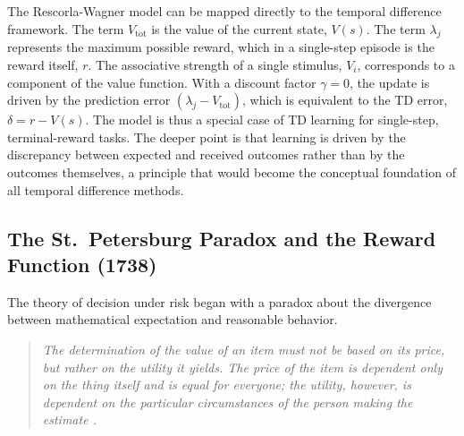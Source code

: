 The Rescorla-Wagner model can be mapped directly to the temporal difference framework. The term $V_{\text{tot}}$ is the value of the current state, $V(s)$. The term $\lambda_j$ represents the maximum possible reward, which in a single-step episode is the reward itself, $r$. The associative strength of a single stimulus, $V_i$, corresponds to a component of the value function. With a discount factor $\gamma=0$, the update is driven by the prediction error $(\lambda_j - V_{\text{tot}})$, which is equivalent to the TD error, $\delta = r - V(s)$. The model is thus a special case of TD learning for single-step, terminal-reward tasks. The deeper point is that learning is driven by the discrepancy between expected and received outcomes rather than by the outcomes themselves, a principle that would become the conceptual foundation of all temporal difference methods.

\subsection{The St.\ Petersburg Paradox and the Reward Function (1738)}

The theory of decision under risk began with a paradox about the divergence between mathematical expectation and reasonable behavior.

\begin{quote}\itshape
The determination of the value of an item must not be based on its price, but rather on the utility it yields. The price of the item is dependent only on the thing itself and is equal for everyone; the utility, however, is dependent on the particular circumstances of the person making the estimate \citep{Bernoulli1738}.
\end{quote}

